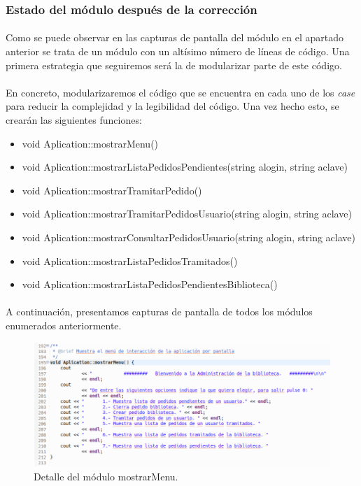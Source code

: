  		\subsubsection{Estado del módulo después de la corrección}
 		
 			\paragraph{}Como se puede observar en las capturas de pantalla del módulo en el apartado anterior se trata de un módulo con un altísimo número de líneas de código. Una primera estrategia que seguiremos será la de modularizar parte de este código.
 			
 			\paragraph{}En concreto, modularizaremos el código que se encuentra en cada uno de los \textit{case} para reducir la complejidad y la legibilidad del código. Una vez hecho esto, se crearán las siguientes funciones:
 			
 			\begin{itemize}
 				\item void Aplication::mostrarMenu()
 				\item void Aplication::mostrarListaPedidosPendientes(string alogin, string aclave)
 				\item void Aplication::mostrarTramitarPedido()
 				\item void Aplication::mostrarTramitarPedidosUsuario(string alogin, string aclave)
 				\item void Aplication::mostrarConsultarPedidosUsuario(string alogin, string aclave)
 				\item void Aplication::mostrarListaPedidosTramitados()
 				\item void Aplication::mostrarListaPedidosPendientesBiblioteca()
 			\end{itemize}
 		
 			\paragraph{}A continuación, presentamos capturas de pantalla de todos los módulos enumerados anteriormente.
 			
 			\begin{figure}[H]
 				\centering
 				\includegraphics[scale=0.5]{img/captura101.png}
 				\caption{Detalle del módulo mostrarMenu.}
 				\label{captura101}
 			\end{figure}
 			
